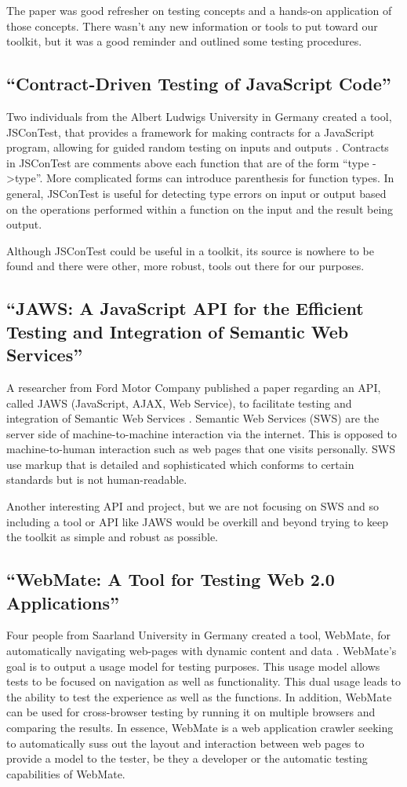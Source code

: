 \documentclass[12pt]{ucthesis}
\begin{document}
The paper was good refresher on testing concepts and a hands-on application of those concepts. There wasn't any new information or tools to put toward our toolkit, but it was a good reminder and outlined some testing procedures.

\subsection{``Contract-Driven Testing of JavaScript Code''}
Two individuals from the Albert Ludwigs University in Germany created a tool, JSConTest, that provides a framework for making contracts for a JavaScript program, allowing for guided random testing on inputs and outputs \cite{ContractDrivenTesting}. Contracts in JSConTest are comments above each function that are of the form ``type -\textgreater \space type''. More complicated forms can introduce parenthesis for function types. In general, JSConTest is useful for detecting type errors on input or output based on the operations performed within a function on the input and the result being output. 

Although JSConTest could be useful in a toolkit, its source is nowhere to be found and there were other, more robust, tools out there for our purposes.

\subsection{``JAWS: A JavaScript API for the Efficient Testing and Integration of Semantic Web Services''}
A researcher from Ford Motor Company published a paper regarding an API, called JAWS (JavaScript, AJAX, Web Service), to facilitate testing and integration of Semantic Web Services \cite{JAWS}. Semantic Web Services (SWS) are the server side of machine-to-machine interaction via the internet. This is opposed to machine-to-human interaction such as web pages that one visits personally. SWS use markup that is detailed and sophisticated which conforms to certain standards but is not human-readable.

Another interesting API and project, but we are not focusing on SWS and so including a tool or API like JAWS would be overkill and beyond trying to keep the toolkit as simple and robust as possible.

\subsection{``WebMate: A Tool for Testing Web 2.0 Applications''}
Four people from Saarland University in Germany created a tool, WebMate, for automatically navigating web-pages with dynamic content and data \cite{WebMate}. WebMate's goal is to output a usage model for testing purposes. This usage model allows tests to be focused on navigation as well as functionality. This dual usage leads to the ability to test the experience as well as the functions. In addition, WebMate can be used for cross-browser testing by running it on multiple browsers and comparing the results. In essence, WebMate is a web application crawler seeking to automatically suss out the layout and interaction between web pages to provide a model to the tester, be they a developer or the automatic testing capabilities of WebMate.
\end{document}
